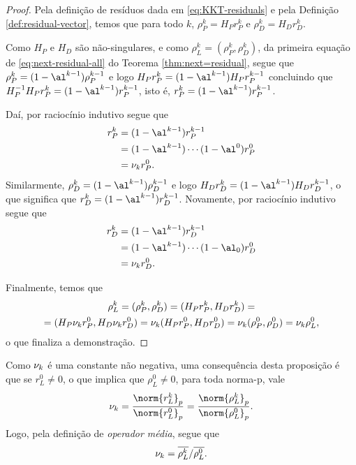 \begin{proof}
	Pela definição de resíduos  dada em \eqref{eq:KKT-residuals}   e pela Definição \ref{def:residual-vector}, temos que para todo $k$, $\rho_{P}^{k} = H_{P}r_{P}^{k} $ e  $\rho_{D}^{k} = H_{D}r_{D}^{k} $. 

	Como $H_{P}$ e $H_{D}$ são não-singulares, e como $\rho_L^{k} = (\rho_P^{k},\rho_D^{k})$,  da primeira equação de \eqref{eq:next-residual-all} do Teorema \ref{thm:next=residual}, segue que $\rho_P^{k}  = (1-\al^{k-1})\rho_P^{k-1}$ e logo $
			H_{P}r_{P}^{k}  = (1-\al^{k-1})H_{P}r_{P}^{k-1}$ concluindo que  
		$H_{P}^{-1}H_{P}r_{P}^{k}  = (1-\al^{k-1})r_{P}^{k-1}$, isto é, $r_{P}^{k}  = (1-\al^{k-1})r_{P}^{k-1}$.

	Daí, por raciocínio indutivo segue que 
	\[
	\begin{aligned}
		r_{P}^{k} & = (1-\al^{k-1})r_{P}^{k-1} \\
	  			   & = (1-\al^{k-1})\cdots(1-\al^{0})r_{P}^{0}\\
				   & = \nuk r_{P}^{0}. 
	\end{aligned}
	\]
Similarmente,  $\rho_D^{k}  = (1-\al^{k-1})\rho_D^{k-1}$ e logo $
			H_{D}r_{D}^{k}  = (1-\al^{k-1})H_{D}r_{D}^{k-1}$, o que significa que   $r_{D}^{k}  = (1-\al^{k-1})r_{D}^{k-1}$. Novamente,  por raciocínio indutivo segue que 
	\[
	\begin{aligned}
		r_{D}^{k} & = (1-\al^{k -1})r_{D}^{k-1} \\
	  			   & = (1-\al^{k -1})\cdots(1-\al_{0})r_{D}^{0}\\
				   & = \nuk   r_{D}^{0}. 
	\end{aligned}
	\]

	Finalmente, temos que 
	\begin{multline*}
	\rho_L^{k} = (\rho_P^{k},\rho_D^{k}) = (H_{P}r_P^{k},H_{D}r_D^{k}) =\\ = (H_{P}\nu_{k} r_{P}^{0},H_{D}\nu_{k} r_{D}^{0})  
	= \nu_{k} (H_{P}r_{P}^{0},H_{D} r_{D}^{0}) =\nu_{k} (\rho_P^{0},\rho_D^{0}) = \nu_{k}  \rho_L^{0},
		\end{multline*}	
		o 	que finaliza a demonstração.
\end{proof}

Como  $\nu_{k} $ é uma constante não negativa,  uma consequência desta proposição é que se $r_L^0\neq 0 $, o que implica que $\rho_L^0\neq 0 $, para toda norma-p, vale 
\[
\nuk  =\frac{\norm{r_L^{k}}_p}{\norm{r_L^{0}}_p} = \frac{\norm{\rho_L^{k}}_p}{\norm{\rho_L^{0}}_p}.
\]
Logo, pela definição de \emph{operador média}, segue que
\begin{equation}
	\label{eq:nu_k}
	\nu_{k}  = {\overline{\rho_L^k}}/{\overline{\rho_L^0}}.
\end{equation}

